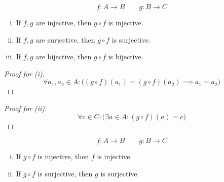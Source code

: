 \begin{frame}{}
  \begin{theorem}[UD Theorem 16.7]
    \[
      f: A \to B \qquad g: B \to C
    \]

    \begin{enumerate}[(i)]
      \item If $f, g$ are injective, then $g \circ f$ is injective.
      \item If $f, g$ are surjective, then $g \circ f$ is surjective.
      \item If $f, g$ are bijective, then $g \circ f$ is bijective.
    \end{enumerate}
  \end{theorem}

  \pause
  \vspace{0.30cm}
  \begin{proof}[Proof for (i)]
    \[
      \forall a_1, a_2 \in A: \Big( (g \circ f)(a_1) = (g \circ f)(a_2) \implies a_1 = a_2 \Big)
    \]
  \end{proof}

  \pause
  \vspace{0.30cm}
  \begin{proof}[Proof for (ii)]
    \[
      \forall c \in C: \Big( \exists a \in A: (g \circ f)(a) = c \Big)
    \]
  \end{proof}
\end{frame}

\begin{frame}{}
  \begin{theorem}[UD Theorem 16.8]
    \[
      f: A \to B \qquad g: B \to C
    \]

    \begin{enumerate}[(i)]
      \item If $g \circ f$ is injective, then $f$ is injective.
      \item If $g \circ f$ is surjective, then $g$ is surjective.
    \end{enumerate}
  \end{theorem}

  \pause
\end{frame}
